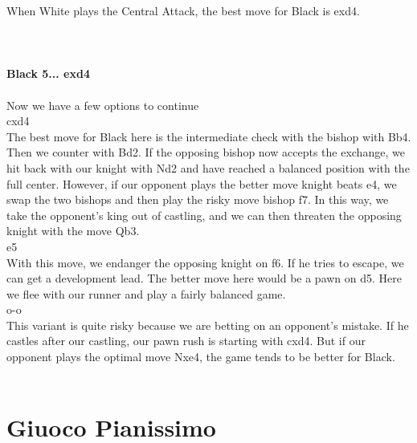 \documentclass{article}
\begin{document}
When White plays the Central Attack, the best move for Black is exd4.\\
\\

\\
\\
\textbf{Black 5... exd4}\\
\\
Now we have a few options to continue\\cxd4\\The best move for Black here is the intermediate check with the bishop with Bb4. Then we counter with Bd2. If the opposing bishop now accepts the exchange, we hit back with our knight with Nd2 and have reached a balanced position with the full center. However, if our opponent plays the better move knight beats e4, we swap the two bishops and then play the risky move bishop f7. In this way, we take the opponent's king out of castling, and we can then threaten the opposing knight with the move Qb3.\\e5\\With this move, we endanger the opposing knight on f6. If he tries to escape, we can get a development lead. The better move here would be a pawn on d5. Here we flee with our runner and play a fairly balanced game.\\o-o\\This variant is quite risky because we are betting on an opponent's mistake. If he castles after our castling, our pawn rush is starting with cxd4. But if our opponent plays the optimal move Nxe4, the game tends to be better for Black.\\
\\
\section{ Giuoco Pianissimo}
\end{document}
